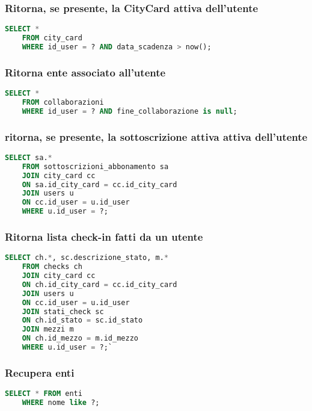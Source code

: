 \subsubsection{Ritorna, se presente, la CityCard attiva dell'utente}
\begin{lstlisting}[language=SQL]
	SELECT *
	FROM city_card
	WHERE id_user = ? AND data_scadenza > now();
\end{lstlisting}

\subsubsection{Ritorna ente associato all'utente}
\begin{lstlisting}[language=SQL]
	SELECT *
	FROM collaborazioni
	WHERE id_user = ? AND fine_collaborazione is null;
\end{lstlisting}


\subsubsection{ritorna, se presente, la sottoscrizione attiva attiva dell'utente}
\begin{lstlisting}[language=SQL]
	SELECT sa.* 
	FROM sottoscrizioni_abbonamento sa
	JOIN city_card cc
	ON sa.id_city_card = cc.id_city_card
	JOIN users u
	ON cc.id_user = u.id_user
	WHERE u.id_user = ?;
\end{lstlisting}


\subsubsection{Ritorna lista check-in fatti da un utente}
\begin{lstlisting}[language=SQL]
	SELECT ch.*, sc.descrizione_stato, m.*
	FROM checks ch
	JOIN city_card cc
	ON ch.id_city_card = cc.id_city_card
	JOIN users u
	ON cc.id_user = u.id_user
	JOIN stati_check sc
	ON ch.id_stato = sc.id_stato
	JOIN mezzi m
	ON ch.id_mezzo = m.id_mezzo
	WHERE u.id_user = ?;`
\end{lstlisting}


\subsubsection{Recupera enti}
\begin{lstlisting}[language=SQL]
	SELECT * FROM enti
	WHERE nome like ?;
\end{lstlisting}




